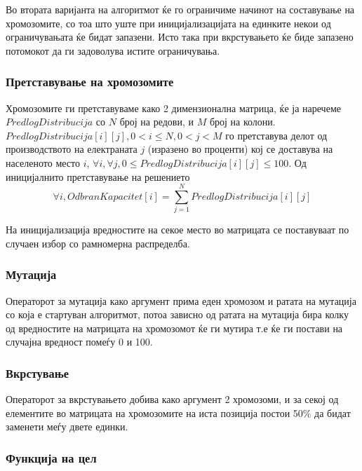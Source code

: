 \documentclass{article}
\begin{document}
Во втората варијанта на алгоритмот ќе го ограничиме начинот на составување на хромозомите, со тоа што уште при иницијализацијата на единките некои од ограничувањата ќе бидат запазени. Исто така при вкрстувањето ќе биде запазено потомокот да ги задоволува истите ограничувања.

\subsubsection{Претставување на хромозомите}

Хромозомите ги претставуваме како 2 димензионална матрица, ќе ја наречеме $PredlogDistribucija$ со $N$ број на редови, и $M$ број на колони. $PredlogDistribucija[i][j], 0 < i \leq N, 0 < j < M$ го претставува делот од производството на електраната $j$ (изразено во проценти) кој се доставува на населеното место $i$, $ \forall i, \forall j, 0 \leq PredlogDistribucija[i][j] \leq 100$. Од иницијалнито претставување на решението 
\[ \forall i, OdbranKapacitet[i] = \sum_{j=1}^{N} PredlogDistribucija[i][j]\]

На иницијализација вредностите на секое место во матрицата се поставуваат по случаен избор со рамномерна распределба.

\subsubsection{Мутација}

Операторот за мутација како аргумент прима еден хромозом и ратата на мутација со која е стартуван алгоритмот, потоа зависно од ратата на мутација бира колку од вредностите на матрицата на хромозомот ќе ги мутира т.е ќе ги постави на случајна вредност помеѓу 0 и 100.
 
\subsubsection{Вкрстување}

Операторот за вкрстувањето добива како аргумент 2 хромозоми, и за секој од елементите во матрицата на хромозомите на иста позиција постои 50\% да бидат заменети меѓу двете единки. 
 
\subsubsection{Функција на цел}
\end{document}
